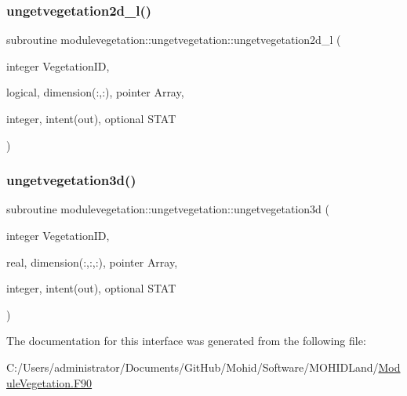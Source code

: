\mbox{\label{interfacemodulevegetation_1_1ungetvegetation_a3a5f3e05f2ca22483ea60985478a2d99}} 
\subsubsection{\texorpdfstring{ungetvegetation2d\+\_\+l()}{ungetvegetation2d\_l()}}
{\footnotesize\ttfamily subroutine modulevegetation\+::ungetvegetation\+::ungetvegetation2d\+\_\+l (\begin{DoxyParamCaption}\item[{integer}]{Vegetation\+ID,  }\item[{logical, dimension(\+:,\+:), pointer}]{Array,  }\item[{integer, intent(out), optional}]{S\+T\+AT }\end{DoxyParamCaption})\hspace{0.3cm}{\ttfamily [private]}}

\mbox{\label{interfacemodulevegetation_1_1ungetvegetation_af47a29473765a05b9f2a60c079df4e1e}} 
\subsubsection{\texorpdfstring{ungetvegetation3d()}{ungetvegetation3d()}}
{\footnotesize\ttfamily subroutine modulevegetation\+::ungetvegetation\+::ungetvegetation3d (\begin{DoxyParamCaption}\item[{integer}]{Vegetation\+ID,  }\item[{real, dimension(\+:,\+:,\+:), pointer}]{Array,  }\item[{integer, intent(out), optional}]{S\+T\+AT }\end{DoxyParamCaption})\hspace{0.3cm}{\ttfamily [private]}}



The documentation for this interface was generated from the following file\+:\begin{DoxyCompactItemize}
\item 
C\+:/\+Users/administrator/\+Documents/\+Git\+Hub/\+Mohid/\+Software/\+M\+O\+H\+I\+D\+Land/\mbox{\hyperlink{_module_vegetation_8_f90}{Module\+Vegetation.\+F90}}\end{DoxyCompactItemize}
